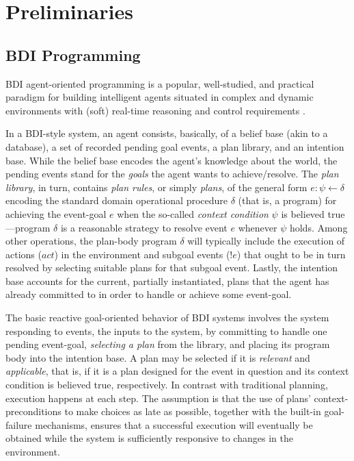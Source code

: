 \section{Preliminaries}\label{sec:preliminaries}

\subsection{BDI Programming}\label{sec:bdi_programming}

BDI agent-oriented programming is a popular, well-studied, and practical paradigm
for building intelligent agents situated in complex and dynamic environments with
(soft) real-time reasoning and control requirements
\cite{Georgeff89-PRS,Benfield:AAMAS06}.

In a BDI-style system, an agent consists, basically, of a belief base (akin to a
database), a set of recorded pending goal events, a plan library, and an
intention base. While the belief base encodes the agent's knowledge about the
world, the pending events stand for the \emph{goals} the agent wants to
achieve/resolve.
The \textit{plan library}, in turn, contains \emph{plan rules}, or simply
\emph{plans}, of the general form $e: \psi \leftarrow \delta$ encoding the
standard domain operational procedure $\delta$ (that is, a program) for achieving
the event-goal $e$ when the so-called \textit{context condition} $\psi$ is
believed true---program $\delta$ is a reasonable strategy to resolve event $e$
whenever $\psi$ holds. Among other operations, the plan-body program $\delta$
will typically include the execution of actions ($act$) in the environment and
subgoal events ($!e$) that ought to be in turn resolved by selecting suitable
plans for that subgoal event. Lastly, the intention base accounts for the
current, partially instantiated, plans that the agent has already committed to in
order to handle or achieve some event-goal.


The basic reactive goal-oriented behavior of BDI systems involves the system
responding to events, the inputs to the system, by committing to handle one
pending event-goal, \textit{selecting a plan} from the library, and placing its
program body  into the intention base.
A plan may be selected if it is \textit{relevant} and \textit{applicable}, that is, if it
is a plan designed for the event in question and its context condition is
believed true, respectively.
In contrast with traditional planning, execution happens at each step. The
assumption is that the use of plans' context-preconditions to make choices as
late as possible, together with the built-in goal-failure mechanisms, ensures
that a successful execution will eventually be obtained while the system is
sufficiently responsive to changes in the environment.



